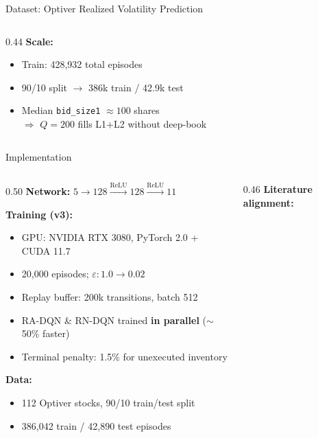 \documentclass[aspectratio=169, 10pt]{beamer}
\begin{document}
\begin{frame}{Dataset: Optiver Realized Volatility Prediction}
\begin{columns}[T]
\begin{column}{0.44\textwidth}
      \medskip
      \textbf{Scale:}
      \begin{itemize}\small
        \item Train: 428,932 total episodes
        \item 90/10 split $\to$ 386k train / 42.9k test
        \item Median \texttt{bid\_size1} $\approx 100$ shares\\
          $\Rightarrow$ $Q{=}200$ fills L1+L2 without deep-book
      \end{itemize}
    \end{column}
  \end{columns}
\end{frame}

\begin{frame}{Implementation}
  \begin{columns}[T]
    \begin{column}{0.50\textwidth}
      \textbf{Network:}
      $5\!\to\!128\!\xrightarrow{\text{ReLU}}\!128\!\xrightarrow{\text{ReLU}}\!11$

      \medskip
      \textbf{Training (v3):}
      \begin{itemize}\small
        \item GPU: NVIDIA RTX 3080, PyTorch 2.0 + CUDA 11.7
        \item 20,000 episodes; $\varepsilon: 1.0\!\to\!0.02$
        \item Replay buffer: 200k transitions, batch 512
        \item RA-DQN \& RN-DQN trained \textbf{in parallel} ($\sim$50\% faster)
        \item Terminal penalty: 1.5\% for unexecuted inventory
      \end{itemize}

      \medskip
      \textbf{Data:}
      \begin{itemize}\small
        \item 112 Optiver stocks, 90/10 train/test split
        \item 386,042 train / 42,890 test episodes
      \end{itemize}
    \end{column}
    \begin{column}{0.46\textwidth}
      \textbf{Literature alignment:}


\end{column}
\end{columns}
\end{frame}
\end{document}
